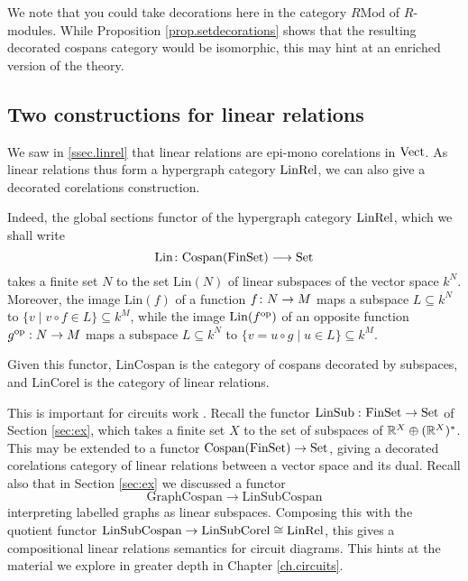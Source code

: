 We note that you could take decorations here in the category $R\mathrm{Mod}$ of
$R$-modules. While Proposition \ref{prop.setdecorations} shows that the
resulting decorated cospans category would be isomorphic, this may hint at an
enriched version of the theory.

\subsection{Two constructions for linear relations}

We saw in \textsection\ref{ssec.linrel} that linear relations are epi-mono
corelations in $\mathrm{Vect}$. As linear relations thus form a hypergraph category
$\mathrm{LinRel}$, we can also give a decorated corelations construction. 

Indeed, the global sections functor of the hypergraph category $\mathrm{LinRel}$, which
we shall write
\[
  \mathrm{Lin} {\colon}\mathrm{Cospan}(\mathrm{FinSet}) \longrightarrow \mathrm{Set}
\]
takes a finite set $N$ to the set $\mathrm{Lin}(N)$ of linear subspaces of the
vector space $k^N$. Moreover, the image $\mathrm{Lin}(f)$ of a function $f{\colon}
N \to M$ maps a subspace $L \subseteq k^N$ to $\{v \mid v\circ f \in L\}
\subseteq k^M$, while the image $\mathrm{Lin}(f^{\mathrm{op}})$ of an opposite function
$g^{\mathrm{op}}: N \to M$ maps a subspace $L \subseteq k^N$ to $\{v = u \circ g \mid u
\in L\} \subseteq k^M$. 

Given this functor, $\mathrm{LinCospan}$ is the category of cospans decorated by
subspaces, and $\mathrm{LinCorel}$ is the category of linear relations. 

This is important for circuits work \cite{BF,BSZ}. Recall the functor
$\operatorname{LinSub}{\colon} \mathrm{FinSet} \to \mathrm{Set}$ of Section \ref{sec:ex}, which takes a finite
set $X$ to the set of subspaces of ${\mathbb{R}}^X \oplus ({\mathbb{R}}^X)^*$.  This may be extended
to a functor $\operatorname{{Cospan}}(\mathrm{FinSet}) \to \mathrm{Set}$, giving a decorated corelations
category of linear relations between a vector space and its dual. Recall also
that in Section \ref{sec:ex} we discussed a functor 
\[
  \mathrm{GraphCospan} \to \mathrm{LinSubCospan}
\]
interpreting labelled graphs as linear subspaces. Composing this with the
quotient functor $\mathrm{LinSubCospan} \to \mathrm{LinSubCorel}\cong \mathrm{LinRel}$,
this gives a compositional linear relations semantics for circuit diagrams. This
hints at the material we explore in greater depth in Chapter \ref{ch.circuits}.



%
%
%







